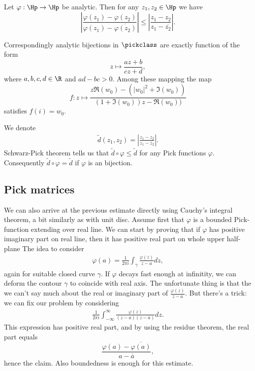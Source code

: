 \begin{lause}
	Let $\varphi : \Hp \to \Hp$ be analytic. Then for any $z_{1}, z_{2} \in \Hp$ we have
	\[
		\left|\frac{\varphi(z_{1}) - \varphi(z_{2})}{\varphi(z_{1}) - \overline{\varphi(z_{2})}} \right| \leq \left|\frac{z_{1} - z_{2}}{z_{1} - \overline{z_{2}}} \right|.
	\]
\end{lause}

Correspondingly analytic bijections in $\pickclass$ are exactly function of the form
\[
	z \mapsto \frac{a z + b}{c z + d},
\]
where $a, b, c, d \in \R$ and $a d - b c > 0$. Among these mapping the map
\[
	f : z \mapsto \frac{z \Re(w_{0}) - (|w_{0}|^2 + \Im(w_{0}))}{(1 + \Im(w_{0})) z - \Re(w_{0}))}
\]
satisfies $f(i) = w_{0}$.

We denote
\begin{align*}
	\tilde{d}(z_{1}, z_{2}) = \left|\frac{z_{1} - z_{2}}{z_{1} - \overline{z_{2}}} \right|.
\end{align*}
Schwarz-Pick theorem tells us that $\tilde{d} \circ \varphi \leq \tilde{d}$ for any Pick functions $\varphi$. Consequently $\tilde{d} \circ \varphi = \tilde{d}$ if $\varphi$ is an bijection.

\subsection{Pick matrices}

We can also arrive at the previous estimate directly using Cauchy's integral theorem, a bit similarly as with unit disc. Assume first that $\varphi$ is a bounded Pick-function extending over real line. We can start by proving that if $\varphi$ has positive imaginary part on real line, then it has positive real part on whole upper half-plane The idea to consider
\begin{align*}
	\varphi(a) = \frac{1}{2 \pi i}\int_{\gamma} \frac{\varphi(z)}{z - a} dz,
\end{align*}
again for suitable closed curve $\gamma$. If $\varphi$ decays fast enough at infinitity, we can deform the contour $\gamma$ to coincide with real axis. The unfortunate thing is that the we can't say much about the real or imaginary part of $ \frac{\varphi(z)}{z - a}$. But there's a trick: we can fix our problem by considering
\begin{align*}
	\frac{1}{2 \pi i}\int_{-\infty}^{\infty} \frac{\varphi(z)}{(z - a) (z - \overline{a})} dz.
\end{align*}
This expression has positive real part, and by using the residue theorem, the real part equals
\[
	\frac{\varphi(a) - \overline{\varphi(a)}}{a - \overline{a}},
\]
hence the claim. Also boundedness is enough for this estimate.

